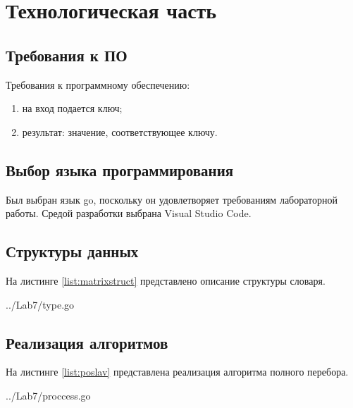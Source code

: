 
\chapter{Технологическая часть}\label{tecnology}

\section{Требования к ПО}\label{Requirements}

Требования к программному обеспечению:
\begin{enumerate}
    \item на вход подается ключ;
    \item результат: значение, соответствующее ключу. 
\end{enumerate}

\section{Выбор языка программирования}\label{Language}

Был выбран язык go, поскольку он удовлетворяет требованиям лабораторной работы. Средой разработки выбрана Visual Studio Code.

\section{Структуры данных}\label{StructsList}

На листинге \ref{list:matrixstruct} представлено описание структуры словаря.

\begin{lstinputlisting}
    [caption = {Структура словаря},
    label = {list:matrixstruct},
    linerange={10-13},
    ]{../Lab7/type.go}
\end{lstinputlisting}

\section{Реализация алгоритмов}\label{Listings}

На листинге \ref{list:poslav} представлена реализация алгоритма полного перебора.

\begin{lstinputlisting}
    [caption = {Реализация последовательного алгоритма нахождения среднего арифметического матрицы},
    label = {list:poslav},
    linerange={5-16},
    ]{../Lab7/proccess.go}
\end{lstinputlisting}

